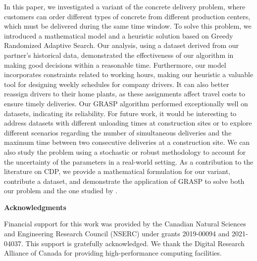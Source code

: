 \documentclass{article}
\begin{document}
In this paper, we investigated a variant of the concrete delivery problem, where customers can order different types of concrete from different production centers, which must be delivered during the same time window. To solve this problem, we introduced a mathematical model and a heuristic solution based on Greedy Randomized Adaptive Search. Our analysis, using a dataset derived from our partner's historical data, demonstrated the effectiveness of our algorithm in making good decisions within a reasonable time. Furthermore, our model incorporates constraints related to working hours, making our heuristic a valuable tool for designing weekly schedules for company drivers. It can also better reassign drivers to their home plants, as these assignments affect travel costs to ensure timely deliveries. Our GRASP algorithm performed exceptionally well on \cite{kinable2014concrete} datasets, indicating its reliability. For future work, it would be interesting to address datasets with different unloading times at construction sites or to explore different scenarios regarding the number of simultaneous deliveries and the maximum time between two consecutive deliveries at a construction site. We can also study the problem using a stochastic or robust methodology to account for the uncertainty of the parameters in a real-world setting. As a contribution to the literature on CDP, we provide a mathematical formulation for our variant, contribute a dataset, and demonstrate the application of GRASP to solve both our problem and the one studied by \cite{kinable2014concrete}.


\vspace{1.5cm} \noindent \textbf{Acknowledgments}

Financial support for this work was provided by the Canadian Natural Sciences and Engineering Research Council (NSERC) under grants 2019-00094 and 2021-04037. This support is gratefully acknowledged. We thank the Digital Research Alliance of Canada for providing high-performance computing facilities.


 
\end{document}
